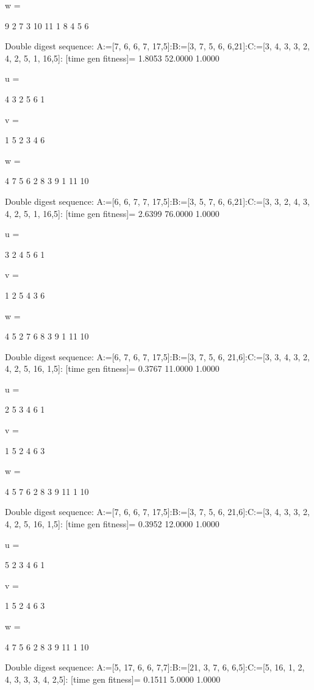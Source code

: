 w =

     9     2     7     3    10    11     1     8     4     5     6

Double digest sequence:
A:=[7, 6, 6, 7, 17,5]:B:=[3, 7, 5, 6, 6,21]:C:=[3, 4, 3, 3, 2, 4, 2, 5, 1, 16,5]:
[time gen fitness]=
    1.8053   52.0000    1.0000


u =

     4     3     2     5     6     1


v =

     1     5     2     3     4     6


w =

     4     7     5     6     2     8     3     9     1    11    10

Double digest sequence:
A:=[6, 6, 7, 7, 17,5]:B:=[3, 5, 7, 6, 6,21]:C:=[3, 3, 2, 4, 3, 4, 2, 5, 1, 16,5]:
[time gen fitness]=
    2.6399   76.0000    1.0000


u =

     3     2     4     5     6     1


v =

     1     2     5     4     3     6


w =

     4     5     2     7     6     8     3     9     1    11    10

Double digest sequence:
A:=[6, 7, 6, 7, 17,5]:B:=[3, 7, 5, 6, 21,6]:C:=[3, 3, 4, 3, 2, 4, 2, 5, 16, 1,5]:
[time gen fitness]=
    0.3767   11.0000    1.0000


u =

     2     5     3     4     6     1


v =

     1     5     2     4     6     3


w =

     4     5     7     6     2     8     3     9    11     1    10

Double digest sequence:
A:=[7, 6, 6, 7, 17,5]:B:=[3, 7, 5, 6, 21,6]:C:=[3, 4, 3, 3, 2, 4, 2, 5, 16, 1,5]:
[time gen fitness]=
    0.3952   12.0000    1.0000


u =

     5     2     3     4     6     1


v =

     1     5     2     4     6     3


w =

     4     7     5     6     2     8     3     9    11     1    10

Double digest sequence:
A:=[5, 17, 6, 6, 7,7]:B:=[21, 3, 7, 6, 6,5]:C:=[5, 16, 1, 2, 4, 3, 3, 3, 4, 2,5]:
[time gen fitness]=
    0.1511    5.0000    1.0000


